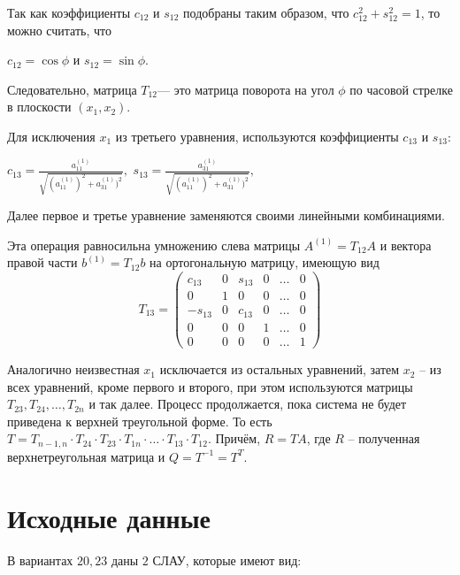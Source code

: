 \documentclass[12pt, a4paper]{article}
\begin{document}
Так как коэффициенты $c_{12}$ и $s_{12}$ подобраны таким образом, что $c_{12}^{2} + s_{12}^{2}=1$, то можно считать, что 
\begin{center}
$c_{12}=\cos{\phi}$ и $s_{12}=\sin{\phi}.$ 
\end{center}	

Следовательно, матрица $T_{12}$--- это матрица поворота на угол $\phi$ по часовой стрелке в плоскости $(x_1,x_2)$. 

\pagebreak

Для исключения $x_1$ из третьего уравнения, используются коэффициенты $c_{13}$ и $s_{13}$:
\begin{center}
    $c_{13}=\frac{a_{11}^{(1)}}{\sqrt{(a_{11}^{(1)})^2+a_{31}^{(1)})^2}},$
    $s_{13}=\frac{a_{31}^{(1)}}{\sqrt{(a_{11}^{(1)})^2+a_{31}^{(1)})^2}},$
\end{center}
    
Далее первое и третье уравнение заменяются своими линейными комбинациями. 

Эта операция равносильна умножению слева матрицы $A^{(1)}=T_{12}A$ и вектора правой части $b^{(1)}=T_{12}b$ на ортогональную матрицу, имеющую вид 
\[
T_{13}=
\begin{pmatrix}
c_{13} & 0 & s_{13} & 0 & \ldots & 0 \\
0 & 1 & 0 & 0 & \ldots & 0 \\
-s_{13} & 0 & c_{13} & 0 & \ldots & 0 \\
0 & 0 & 0 & 1 & \ldots & 0 \\
0 & 0 & 0 & 0 & \ldots & 1
\end{pmatrix}
\]

Аналогично неизвестная $x_{1}$ исключается из остальных уравнений, затем \linebreak $x_{2}$ -- из всех уравнений, кроме первого и второго, при этом используются матрицы $T_{23},T_{24}, \ldots, T_{2n}$ и так далее. Процесс продолжается, пока система не будет приведена к верхней треугольной форме. То есть $ T = T_{n - 1, n} \cdot T_{24} \cdot T_{23} \cdot T_{1n} \cdot \ldots \cdot T_{13} \cdot T_{12}. $ Причём, $R=TA$, где $R$ -- полученная верхнетреугольная матрица и $Q=T^{-1}=T^{T}.$

\newpage

\section{Исходные данные}
В вариантах $20, 23$ даны $2$ СЛАУ, которые имеют вид: 
\end{document}
